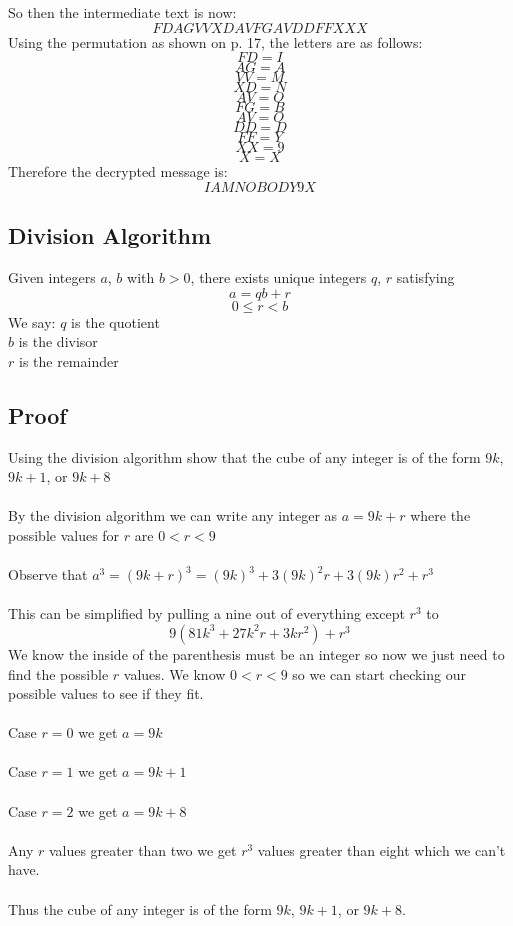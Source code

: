 \documentclass{article}
\begin{document}
So then the intermediate text is now: $$FDAGVVXDAVFGAVDDFFXXX$$
Using the permutation as shown on p. 17, the letters are as follows:
$$FD = I$$
$$AG = A$$
$$VV = M$$
$$XD = N$$
$$AV = O$$
$$FG = B$$
$$AV = O$$
$$DD = D$$
$$FF = Y$$
$$XX = 9$$
$$X = X$$
Therefore the decrypted message is: $$IAMNOBODY9X$$

\subsection{Division Algorithm}

Given integers $a$, $b$ with $b > 0$, there exists unique integers $q$, $r$ satisfying $$a = qb + r$$
$$0 \le r < b$$
We say: $q$ is the quotient\\
$b$ is the divisor\\
$r$ is the remainder\\

\subsection{Proof}
Using the division algorithm show that the cube of any integer is of the form $9k$, $9k+1$, or $9k+8$\\\\
By the division algorithm we can write any integer as $a = 9k + r$ where the possible values for $r$ are $0 < r < 9$\\\\
Observe that $a^3 = (9k + r)^3 = (9k)^3 + 3(9k)^2r + 3(9k)r^2 + r^3$\\\\
This can be simplified by pulling a nine out of everything except $r^3$ to $$9(81k^3+27k^2r+3kr^2) + r^3$$
We know the inside of the parenthesis must be an integer so now we just need to find the possible $r$ values. We know $0 < r < 9$ so we can start checking our possible values to see if they fit. 
\\\\
Case $r=0$ we get $a=9k$
\\\\
Case $r=1$ we get $a=9k+1$
\\\\
Case $r=2$ we get $a=9k+8$
\\\\
Any $r$ values greater than two we get $r^3$ values greater than eight which we can't have.
\\\\
Thus the cube of any integer is of the form $9k$, $9k+1$, or $9k+8$.
\end{document}
